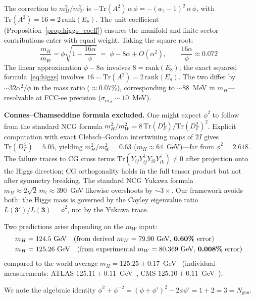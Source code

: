 \documentclass[12pt,a4paper]{article}
\theoremstyle{definition}
\begin{document}
The correction to $m_H^2/m_W^2$ is $-\mathrm{Tr}(A^2)\,\alpha\,\phi = -(a_1-1)^2\,\alpha\,\phi$, with $\mathrm{Tr}(A^2) = 16 = 2\,\mathrm{rank}(E_8)$.  The unit coefficient (Proposition~\ref{prop:higgs_coeff}) ensures the manifold and finite-sector contributions enter with equal weight.  Taking the square root:
\begin{equation}
\frac{m_H}{m_W} = \phi\sqrt{1 - \frac{16\alpha}{\phi}} \;=\; \phi - 8\alpha + O(\alpha^2), \qquad \frac{16\alpha}{\phi} \approx 0.072
\label{eq:higgs_correction}
\end{equation}
The linear approximation $\phi - 8\alpha$ involves $8 = \mathrm{rank}(E_8)$; the exact squared formula~\eqref{eq:higgs} involves $16 = \mathrm{Tr}(A^2) = 2\,\mathrm{rank}(E_8)$.  The two differ by $\sim\!32\alpha^2/\phi$ in the mass ratio ($\approx 0.07\%$), corresponding to $\sim\!88$~MeV in $m_H$---resolvable at FCC-ee precision ($\sigma_{m_H} \sim 10$~MeV).

\textbf{Connes--Chamseddine formula excluded.}  One might expect $\phi^2$ to follow from the standard NCG formula $m_H^2/m_W^2 = 8\,\mathrm{Tr}(D_F^4)/\mathrm{Tr}(D_F^2)^2$.  Explicit computation with exact Clebsch--Gordan intertwining maps of $2I$ gives $\mathrm{Tr}(D_F^4) = 5.05$, yielding $m_H^2/m_W^2 = 0.63$ ($m_H \approx 64$~GeV)---far from $\phi^2 = 2.618$.  The failure traces to CG cross terms $\mathrm{Tr}(Y_{ij}Y_{ij}^\dagger Y_{ik}Y_{ik}^\dagger) \neq 0$ after projection onto the Higgs direction; CG orthogonality holds in the full tensor product but not after symmetry breaking.  The standard NCG Yukawa formula $m_H \approx 2\sqrt{2}\,m_t \approx 390$~GeV likewise overshoots by $\sim\!3\times$.  Our framework avoids both: the Higgs mass is governed by the Cayley eigenvalue ratio $L(\mathbf{3'})/L(\mathbf{3}) = \phi^2$, not by the Yukawa trace.

Two predictions arise depending on the $m_W$ input:
\begin{align}
m_H &= 124.5\text{~GeV} \quad \text{(from derived } m_W = 79.90\text{~GeV, \textbf{0.60\%} error)} \notag \\
m_H &= 125.26\text{~GeV} \quad \text{(from experimental } m_W = 80.369\text{~GeV, \textbf{0.008\%} error)}
\end{align}
compared to the world average $m_H = 125.25 \pm 0.17$~GeV~\cite{pdg2024} (individual measurements: ATLAS $125.11 \pm 0.11$~GeV~\cite{atlas_higgs2023}, CMS $125.10 \pm 0.11$~GeV~\cite{cms_higgs2024}).

We note the algebraic identity $\phi^2 + \phi^{-2} = (\phi + \phi')^2 - 2\phi\phi' = 1 + 2 = 3 = N_{\text{gen}}$.
\end{document}
